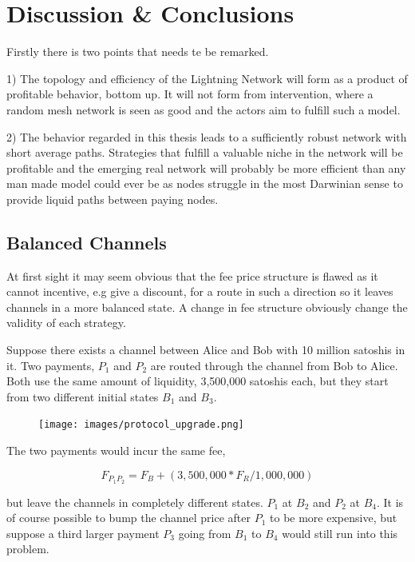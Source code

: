 \chapter{Discussion \& Conclusions}

Firstly there is two points that needs te be remarked.
 
1) The topology and efficiency of the \gls{Lightning Network} will form as a product of profitable behavior, bottom up. It will not form from intervention, where a random mesh network is seen as good and the actors aim to fulfill such a model.
 
2) The behavior regarded in this thesis leads to a sufficiently robust network with short average paths. Strategies that fulfill a valuable niche in the network will be profitable and the emerging real network will probably be more efficient than any man made model could ever be as nodes struggle in the most Darwinian sense to provide liquid paths between paying nodes.

\section{Balanced Channels}

At first sight it may seem obvious that the fee price structure is flawed as it cannot incentive, e.g give a discount, for a route in such a direction so it leaves channels in a more balanced state. A change in fee structure obviously change the validity of each strategy.

Suppose there exists a channel between Alice and Bob with 10 million satoshis in it. 
Two payments, $P_{1}$ and $P_{2}$ are routed through the channel from Bob to Alice.
Both use the same amount of liquidity, 3,500,000 satoshis each, but they start from two different initial states $B_{1}$ and $B_3$.

\begin{figure}[!htb]
	\hspace*{0.7cm} 
	\centering
	\texttt{[image: images/protocol\_upgrade.png]}
	
	\label{fig:upgrade}
	\hspace*{2mm} 	
\end{figure}

The two payments would incur the same fee, 

\[ F_{P_1 P_2} = F_B + (3,500,000 * F_R / 1,000,000) \]

but leave the channels in completely different states. $P_1$ at $B_2$ and $P_2$ at $B_4$. It is of course possible to bump the channel price after $P_1$ to
be more expensive, but suppose a third larger payment $P_3$ going from $B_1$ to $B_4$ would still run into this problem.

